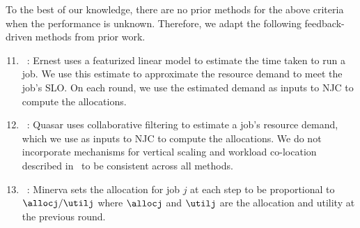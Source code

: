 To the best of our knowledge, there are no prior methods for the above criteria
when the performance is unknown.
Therefore, we adapt the following feedback-driven methods from prior work.
\begin{enumerate}[label=\arabic*)]
\setcounter{enumi}{10}
\item \ernest~\citep{venkataraman2016ernest}:
Ernest uses a featurized linear model  to estimate the
time taken to run a job.
We use this estimate to approximate the resource demand to meet the job's SLO.
On each round, we use the estimated demand as inputs to NJC to compute the allocations.
\vspace{-0.05in}

\item \quasar~\citep{delimitrou2014quasar}:
Quasar uses collaborative filtering to estimate a job's resource demand, which we
use as inputs to NJC to compute the allocations.
We do not incorporate mechanisms for vertical scaling and workload co-location described
in~\citep{delimitrou2014quasar} to be consistent across all methods.
\vspace{-0.05in}

\item \minerva~\citep{nathan2019end}: 
Minerva sets the allocation for
job $j$ at each step to be proportional to $\allocj/\utilj$ where $\allocj$ and $\utilj$ are the
allocation and utility at the previous round.


\end{enumerate}
